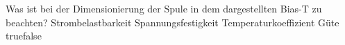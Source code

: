    {Was ist bei der Dimensionierung der Spule in dem dargestellten Bias-T zu beachten?}
    {Strombelastbarkeit}
    {Spannungsfestigkeit}
    {Temperaturkoeffizient}
    {Güte}
    {true}{false}